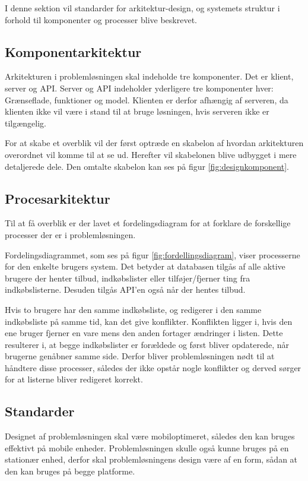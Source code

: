 I denne sektion vil standarder for arkitektur-design,  og systemets struktur i forhold til komponenter og processer blive beskrevet.

\subsection{Komponentarkitektur}
Arkitekturen i problemløsningen skal indeholde tre komponenter. Det er klient, server og API. Server og API indeholder yderligere tre komponenter hver: Grænseflade, funktioner og model. Klienten er derfor afhængig af serveren, da klienten ikke vil være i stand til at bruge løsningen, hvis serveren ikke er tilgængelig.

For at skabe et overblik vil der først optræde en skabelon af hvordan arkitekturen overordnet vil komme til at se ud. Herefter vil skabelonen blive udbygget i mere detaljerede dele. Den omtalte skabelon kan ses på figur \ref{fig:designkomponent}.

\subsection{Procesarkitektur}
Til at få overblik er der lavet et fordelingsdiagram for at forklare de forskellige processer der er i problemløsningen. 


Fordelingsdiagrammet, som ses på figur \ref{fig:fordellingsdiagram}, viser processerne for den enkelte brugers system. Det betyder at databasen tilgås af alle aktive brugere der henter tilbud, indkøbslister eller tilføjer/fjerner ting fra indkøbslisterne. Desuden tilgås API'en også når der hentes tilbud.

Hvis to brugere har den samme indkøbsliste, og redigerer i den samme indkøbsliste på samme tid, kan det give konflikter. Konflikten ligger i, hvis den ene bruger fjerner en vare mens den anden fortager ændringer i listen. Dette resulterer i, at begge indkøbslister er forældede og først bliver opdaterede, når brugerne genåbner samme side. Derfor bliver problemløsningen nødt til at håndtere disse processer, således der ikke opstår nogle konflikter og derved sørger for at listerne bliver redigeret korrekt.

\subsection{Standarder}
Designet af problemløsningen skal være mobiloptimeret, således den kan bruges effektivt på mobile enheder. Problemløsningen skulle også kunne bruges på en stationær enhed, derfor skal problemløsningens design være af en form, sådan at den kan bruges på begge platforme.
